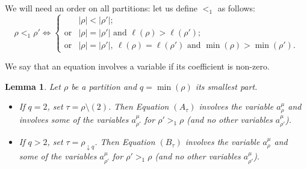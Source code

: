 \documentclass[11pt]{amsart}
\theoremstyle{plain}
\newtheorem{lemma}{Lemma}[section]
\theoremstyle{remark}
\begin{document}
We will need an order on all partitions: let us define $<_1$ as follows:
\[ \rho <_1 \rho' \iff
\begin{cases}
    & |\rho| <|\rho'|; \\
    \text{or}&|\rho| = |\rho'| \text{ and } \ell(\rho) > \ell(\rho'); \\
    \text{or}&|\rho|= |\rho'|,\ \ell(\rho) = \ell(\rho') \text{ and } \min(\rho) > \min(\rho').
\end{cases}\]

We say that an equation involves a variable if its coefficient is non-zero.
\begin{lemma}
    Let $\rho$ be a partition and $q=\min(\rho)$ its smallest part.
    \begin{itemize}
        \item If $q=2$, set $\tau=\rho\setminus (2)$.
            Then Equation $(A_\tau)$ involves the variable $a^\mu_\rho$
            and involves some of the variables $a^\mu_{\rho'}$ for $\rho' >_1 \rho$ 
            (and no other variables $a^\mu_{\rho'}$).
        \item If $q>2$, set $\tau= \rho_{\downarrow q}$.
            Then Equation $(B_\tau)$ involves the variable $a^\mu_\rho$
            and some of the variables $a^\mu_{\rho'}$ for $\rho' >_1 \rho$
            (and no other variables $a^\mu_{\rho'}$).
    \end{itemize}
    \label{LemTriangle}
\end{lemma}
\end{document}
